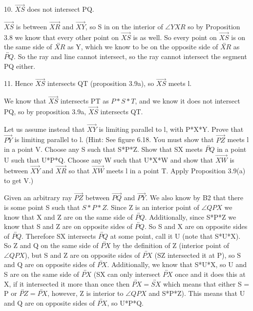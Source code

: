 \documentclass[12pt,letterpaper]{article}
\newcommand{\Proof}{\noindent {\bf Proof: }}
\newcommand{\prob}[1]{\newpage\noindent {\bf #1}}
\begin{document}
10. $\overrightarrow{XS}$ does not intersect PQ.  

$\overrightarrow{XS}$ is between $\overrightarrow{XR}$ and $\overrightarrow{XY}$, so S in on the interior of $\angle YXR$ so by Proposition 3.8 we know that every other point on $\overrightarrow{XS}$ is as well.  So every point on $\overrightarrow{XS}$ is on the same side of $\overleftrightarrow{XR}$ as Y, which we know to be on the opposite side of $\overleftrightarrow{XR}$ as $\overleftrightarrow{PQ}$.  So the ray and line cannot intersect, so the ray cannot intersect the segment PQ either. 



11. Hence $\overrightarrow{XS}$ intersects QT (proposition 3.9a), so $\overrightarrow{XS}$ meets l. 

We know that $\overrightarrow{XS}$ intersects PT as $P*S*T$, and we know it does not intersect PQ, so by proposition 3.9a, $\overrightarrow{XS}$ intersects QT.




\prob{7 } Let us assume instead that $\overrightarrow{XY}$ is limiting parallel to l, with P*X*Y.  Prove that $\overrightarrow{PY}$ is limiting parallel to l.  (Hint: See figure 6.18.  You must show that $\overrightarrow{PZ}$ meets l in a point V.  Choose any S such that S*P*Z.  Show that SX meets $\overleftrightarrow{PQ}$ in a point U such that U*P*Q.  Choose any W such that U*X*W and show that $\overrightarrow{XW}$ is between $\overrightarrow{XY}$ and $\overrightarrow{XR}$ so that $\overrightarrow{XW}$ meets l in a point T.  Apply Proposition 3.9(a) to get V.)

\Proof


Given an arbitrary ray $\overrightarrow{PZ}$ between $\overrightarrow{PQ}$ and $\overrightarrow{PY}$.  We also know by B2 that there is some point S such that $S*P*Z$. Since Z is an interior point of $\angle QPX$ we know that X and Z are on the same side of $\overleftrightarrow{PQ}$.  Additionally, since S*P*Z we know that S and Z are on opposite sides of  $\overleftrightarrow{PQ}$.  So S and X are on opposite sides of $\overleftrightarrow{PQ}$.  Therefore SX intersects $\overleftrightarrow{PQ}$ at some point, call it U (note that S*U*X).  \\

So Z and Q on the same side of $\overleftrightarrow{PX}$ by the definition of Z (interior point of $\angle QPX$), but S and Z are on opposite sides of $\overleftrightarrow{PX}$ (SZ intersected it at P), so S and Q are on opposite sides of $\overleftrightarrow{PX}$.  Additionally, we know that S*U*X, so U and S are on the same side of $\overleftrightarrow{PX}$ (SX can only intersect $\overleftrightarrow{PX}$ once and it does this at X, if it intersected it more than once then $\overleftrightarrow{PX} = \overleftrightarrow{SX}$ which means that either S = P or $\overleftrightarrow{PZ} = \overleftrightarrow{PX}$, however, Z is interior to $\angle QPX$ and S*P*Z). This means that U and Q are on opposite sides of $\overleftrightarrow{PX}$, so U*P*Q.\\
\end{document}
